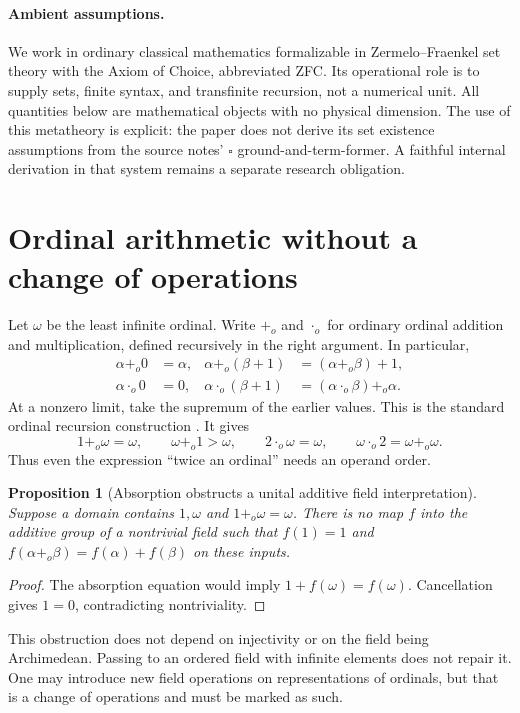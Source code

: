 \documentclass[11pt]{article}
\newtheorem{proposition}[theorem]{Proposition}
\theoremstyle{definition}
\begin{document}
\paragraph{Ambient assumptions.}
We work in ordinary classical mathematics formalizable in Zermelo--Fraenkel set theory with the Axiom of Choice, abbreviated ZFC. Its operational role is to supply sets, finite syntax, and transfinite recursion, not a numerical unit. All quantities below are mathematical objects with no physical dimension. The use of this metatheory is explicit: the paper does not derive its set existence assumptions from the source notes' $\square$ ground-and-term-former. A faithful internal derivation in that system remains a separate research obligation.

\section{Ordinal arithmetic without a change of operations}
Let $\omega$ be the least infinite ordinal. Write $+_o$ and $\cdot_o$ for ordinary ordinal addition and multiplication, defined recursively in the right argument. In particular,
\begin{align*}
\alpha+_o0&=\alpha,&\alpha+_o(\beta+1)&=(\alpha+_o\beta)+1,\\
\alpha\cdot_o0&=0,&\alpha\cdot_o(\beta+1)&=(\alpha\cdot_o\beta)+_o\alpha.
\end{align*}
At a nonzero limit, take the supremum of the earlier values. This is the standard ordinal recursion construction \cite{halbeisen}. It gives
\[
1+_o\omega=\omega,\qquad \omega+_o1>\omega,
\qquad 2\cdot_o\omega=\omega,\qquad \omega\cdot_o2=\omega+_o\omega.
\]
Thus even the expression ``twice an ordinal'' needs an operand order.

\begin{proposition}[Absorption obstructs a unital additive field interpretation]
Suppose a domain contains $1,\omega$ and $1+_o\omega=\omega$. There is no map $f$ into the additive group of a nontrivial field such that $f(1)=1$ and $f(\alpha+_o\beta)=f(\alpha)+f(\beta)$ on these inputs.
\end{proposition}
\begin{proof}
The absorption equation would imply $1+f(\omega)=f(\omega)$. Cancellation gives $1=0$, contradicting nontriviality.
\end{proof}

This obstruction does not depend on injectivity or on the field being Archimedean. Passing to an ordered field with infinite elements does not repair it. One may introduce new field operations on representations of ordinals, but that is a change of operations and must be marked as such.
\end{document}
